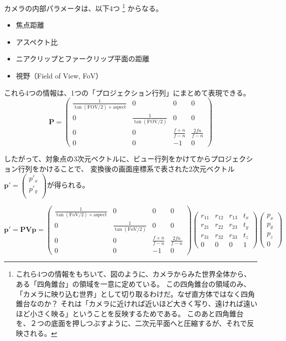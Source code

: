 カメラの内部パラメータは、以下4つ
\footnote{
  これら4つの情報をもちいて、図のように、カメラからみた世界全体から、ある「四角錐台」の領域を一意に定めている。
  この四角錐台の領域のみ、「カメラに映り込む世界」として切り取るわけだ。なぜ直方体ではなく四角錐台なのか？
  それは「カメラに近ければ近いほど大きく写り、遠ければ遠いほど小さく映る」ということを反映するためである。
  このあと四角錐台を、２つの底面を押しつぶすように、二次元平面へと圧縮するが、それで反映される。
}
からなる。
\begin{itemize}
  \item 焦点距離
  \item アスペクト比
  \item ニアクリップとファークリップ平面の距離
  \item 視野（Field of View, FoV）
\end{itemize}
これら4つの情報は、1つの「プロジェクション行列」にまとめて表現できる。
$$
\mathbf{P} = 
\begin{pmatrix}
\frac{1}{\tan(\text{FOV}/2) \times \text{aspect}} & 0 & 0 & 0 \\
0 & \frac{1}{\tan(\text{FOV}/2)} & 0 & 0 \\
0 & 0 & \frac{f+n}{f-n} & \frac{2fn}{f-n} \\
0 & 0 & -1 & 0
\end{pmatrix}
$$

したがって、対象点の3次元ベクトルに、ビュー行列をかけてからプロジェクション行列をかけることで、
変換後の画面座標系で表された2次元ベクトル$\bm{p'} =
\begin{pmatrix}
  {p'_x} \\
  {p'_y} \\    
\end{pmatrix}
$が得られる。

$$
\bm{p'} =  
  \mathbf{P} \mathbf{V} \bm{p}
  =
  \begin{pmatrix}
    \frac{1}{\tan(\text{FoV}/2) \times \text{aspect}} & 0 & 0 & 0 \\
    0 & \frac{1}{\tan(\text{FoV}/2)} & 0 & 0 \\
    0 & 0 & \frac{f+n}{f-n} & \frac{2fn}{f-n} \\
    0 & 0 & -1 & 0
    \end{pmatrix}
    \begin{pmatrix}
      r_{11} & r_{12} & r_{13} & t_x \\
      r_{21} & r_{22} & r_{23} & t_y \\
      r_{31} & r_{32} & r_{33} & t_z \\
      0 & 0 & 0 & 1
    \end{pmatrix}    
    \begin{pmatrix}
    {p_x} \\
    {p_y} \\
    {p_z} \\
    {0}
    \end{pmatrix}
$$

